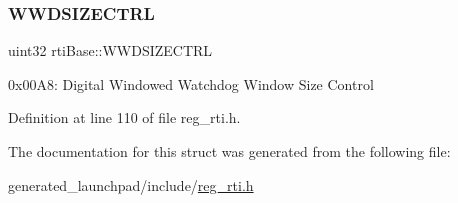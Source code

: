 \subsubsection{\texorpdfstring{W\+W\+D\+S\+I\+Z\+E\+C\+T\+RL}{WWDSIZECTRL}}
{\footnotesize\ttfamily uint32 rti\+Base\+::\+W\+W\+D\+S\+I\+Z\+E\+C\+T\+RL}

0x00\+A8\+: Digital Windowed Watchdog Window Size Control 

Definition at line 110 of file reg\+\_\+rti.\+h.



The documentation for this struct was generated from the following file\+:\begin{DoxyCompactItemize}
\item 
generated\+\_\+launchpad/include/\mbox{\hyperlink{reg__rti_8h}{reg\+\_\+rti.\+h}}\end{DoxyCompactItemize}
